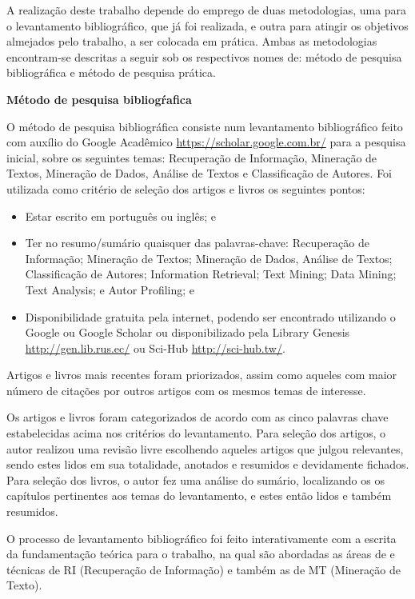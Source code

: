 A realização deste trabalho depende do emprego de duas metodologias, uma para o levantamento bibliográfico, que já foi realizada, e outra para atingir os objetivos almejados pelo trabalho, a ser colocada em prática.
Ambas as metodologias encontram-se descritas a seguir sob os respectivos nomes de: método de pesquisa bibliográfica e método de pesquisa prática.

\textbf{Método de pesquisa bibliogŕafica}

O método de pesquisa bibliográfica consiste num levantamento bibliográfico feito com auxílio do Google Acadêmico \url{https://scholar.google.com.br/} para a pesquisa inicial, sobre os seguintes temas: Recuperação de Informação, Mineração de Textos, Mineração de Dados, Análise de Textos e Classificação de Autores.
Foi utilizada como critério de seleção dos artigos e livros os seguintes pontos:
\begin{itemize}
    \item Estar escrito em português ou inglês; e
    \item Ter no resumo/sumário quaisquer das palavras-chave: Recuperação de Informação; Mineração de Textos; Mineração de Dados, Análise de Textos; Classificação de Autores; Information Retrieval; Text Mining; Data Mining; Text Analysis; e Autor Profiling; e
    \item Disponibilidade gratuita pela internet, podendo ser encontrado utilizando o Google ou Google Scholar ou disponibilizado pela Library Genesis \url{http://gen.lib.rus.ec/} ou Sci-Hub \url{http://sci-hub.tw/}.
\end{itemize}
Artigos e livros mais recentes foram priorizados, assim como aqueles com maior número de citações por outros artigos com os mesmos temas de interesse.

Os artigos e livros foram categorizados de acordo com as cinco palavras chave estabelecidas acima nos critérios do levantamento.
Para seleção dos artigos, o autor realizou uma revisão livre escolhendo aqueles artigos que julgou relevantes, sendo estes lidos em sua totalidade, anotados e resumidos e devidamente fichados. 
Para seleção dos livros, o autor fez uma análise do sumário, localizando os os capítulos pertinentes aos temas do levantamento, e estes então lidos e também resumidos.

O processo de levantamento bibliográfico foi feito interativamente com a escrita da fundamentação teórica para o  trabalho, na qual são abordadas as áreas de e técnicas de RI (Recuperação de Informação) e também as de MT (Mineração de Texto).

